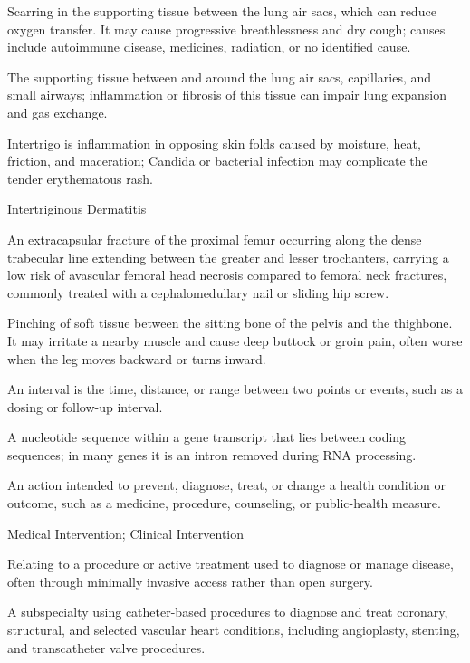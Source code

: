  Scarring in the supporting tissue between the lung air sacs, which can reduce oxygen transfer. It may cause progressive breathlessness and dry cough; causes include autoimmune disease, medicines, radiation, or no identified cause.

 The supporting tissue between and around the lung air sacs, capillaries, and small airways; inflammation or fibrosis of this tissue can impair lung expansion and gas exchange.

 Intertrigo is inflammation in opposing skin folds caused by moisture, heat, friction, and maceration; Candida or bacterial infection may complicate the tender erythematous rash.

\synonyms
Intertriginous Dermatitis

 An extracapsular fracture of the proximal femur occurring along the dense trabecular line extending between the greater and lesser trochanters, carrying a low risk of avascular femoral head necrosis compared to femoral neck fractures, commonly treated with a cephalomedullary nail or sliding hip screw.

 Pinching of soft tissue between the sitting bone of the pelvis and the thighbone. It may irritate a nearby muscle and cause deep buttock or groin pain, often worse when the leg moves backward or turns inward.

 An interval is the time, distance, or range between two points or events, such as a dosing or follow-up interval.

 A nucleotide sequence within a gene transcript that lies between coding sequences; in many genes it is an intron removed during RNA processing.

 An action intended to prevent, diagnose, treat, or change a health condition or outcome, such as a medicine, procedure, counseling, or public-health measure.

\synonyms
Medical Intervention; Clinical Intervention

 Relating to a procedure or active treatment used to diagnose or manage disease, often through minimally invasive access rather than open surgery.

 A subspecialty using catheter-based procedures to diagnose and treat coronary, structural, and selected vascular heart conditions, including angioplasty, stenting, and transcatheter valve procedures.


